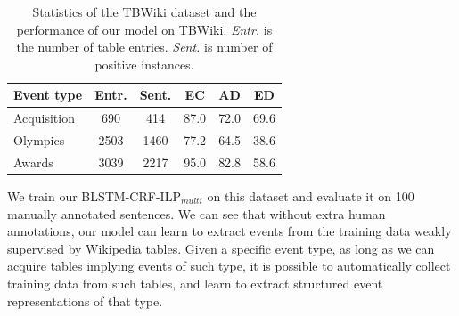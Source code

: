 \begin{table}[h]
\small
\centering
\begin{tabular}{|l|c|c|c|c|c|} \hline
	Event type & Entr. & Sent. & EC & AD & ED \\ \hline
	Acquisition & 690 & 414 & 87.0 & 72.0 & 69.6 \\ \hline
	Olympics & 2503 & 1460 & 77.2 & 64.5 & 38.6 \\ \hline
	Awards & 3039 & 2217 & 95.0 & 82.8 & 58.6 \\ \hline
\end{tabular}
\caption{Statistics of the TBWiki dataset and the performance of our model on TBWiki. \textit{Entr.} is the number of table entries. \textit{Sent.} is number of positive instances.\label{tab:6}}
\end{table}

We train our BLSTM-CRF-ILP$_{multi}$ on this dataset and evaluate it on 100 manually annotated sentences.
We can see that without extra human annotations, %
our model can learn to extract events from the training data weakly supervised by Wikipedia tables. Given a specific event type, as long as we can acquire tables implying events of such type, it is possible to automatically collect training data from such tables, and learn to extract structured event representations of that type. %


